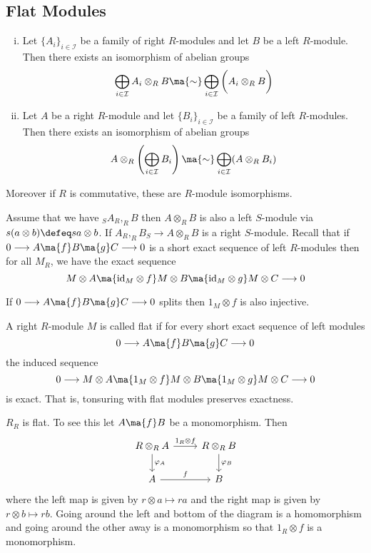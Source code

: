 \newpage
\subsection{Flat Modules} 

\begin{thm}
\begin{enumerate}[(i)]
\item Let $\{A_i\}_{i \in \mathcal{I}}$ be a family of right $R$-modules and let $B$ be a left $R$-module. Then there exists an isomorphism of abelian groups
\[
\bigoplus_{i \in \mathcal{I}} A_i \otimes_R B \ma{\sim} \bigoplus_{i \in \mathcal{I}} \bigg( A_i \otimes_R B \bigg)
\]
\item Let $A$ be a right $R$-module and let $\{B_i\}_{i \in \mathcal{I}}$ be a family of left $R$-modules. Then there exists an isomorphism of abelian groups
\[
A \otimes_R \left( \bigoplus_{i \in \mathcal{I}} B_i \right) \ma{\sim} \bigoplus_{i \in \mathcal{I}} (A \otimes_R B_i)
\]
\end{enumerate}
Moreover if $R$ is commutative, these are $R$-module isomorphisms. 
\end{thm}

Assume that we have $_S A_R, _R B$ then $A \otimes_R B$ is also a left $S$-module via $s(a \otimes b) \defeq sa \otimes b$. If $A_R,_R B_S \rightarrow A \otimes_R B$ is a right $S$-module. Recall that if $0 \longrightarrow A \ma{f} B \ma{g} C \longrightarrow 0$ is a short exact sequence of left $R$-modules then for all $M_R$, we have the exact sequence
\[
M \otimes A \ma{\text{id}_M \otimes f} M \otimes B \ma{\text{id}_M \otimes g} M \otimes C \longrightarrow 0
\]

\begin{ex}
If $0 \longrightarrow A \ma{f} B \ma{g} C \longrightarrow 0$ splits then $1_M \otimes f$ is also injective. 
\end{ex}

\begin{dfn}
A right $R$-module $M$ is called flat if for every short exact sequence of left modules
\[
0 \longrightarrow A \ma{f} B \ma{g} C \longrightarrow 0
\]
the induced sequence 
\[
0 \longrightarrow M \otimes A \ma{1_M \otimes f} M \otimes B \ma{1_M \otimes g} M \otimes C \longrightarrow 0
\]
is exact. That is, tonsuring with flat modules preserves exactness. 
\end{dfn}

\begin{ex}
$R_R$ is flat. To see this let $A \ma{f} B$ be a monomorphism. Then
\[
\begin{tikzcd}
R \otimes_R A \arrow{d}{\varphi_A} \arrow{r}{1_R \otimes f} & R \otimes_R B \arrow{d}{\varphi_B} \\
A \arrow{r}{f} & B 
\end{tikzcd}
\]
where the left map is given by $r \otimes a \mapsto ra$ and the right map is given by $r \otimes b \mapsto rb$. Going around the left and bottom of the diagram is a homomorphism and going around the other away is a monomorphism so that $1_R \otimes f$ is a monomorphism. 
\end{ex}

